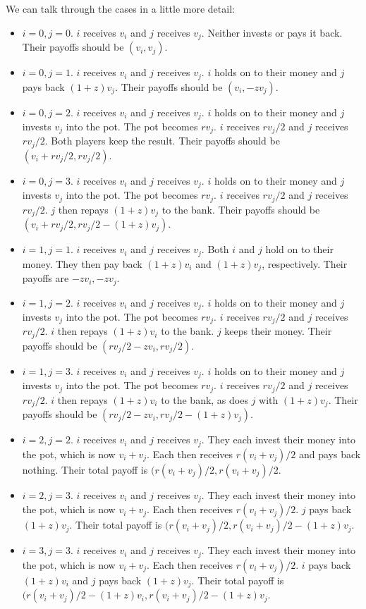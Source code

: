 \documentclass[13pt]{amsart}
\begin{document}
We can talk through the cases in a little more detail:
\begin{itemize}
    \item $i = 0, j = 0$.
    $i$ receives $v_i$ and $j$ receives $v_j$.
    Neither invests or pays it back.
    Their payoffs should be $(v_i, v_j)$.
    \item $i = 0, j = 1$.
    $i$ receives $v_i$ and $j$ receives $v_j$.
    $i$ holds on to their money and $j$ pays back $(1+z)v_j$.
    Their payoffs should be $(v_i, -zv_j)$.
    \item $i = 0, j = 2$.
    $i$ receives $v_i$ and $j$ receives $v_j$.
    $i$ holds on to their money and $j$ invests $v_j$ into the pot.
    The pot becomes $rv_j$.
    $i$ receives $rv_j/2$ and $j$ receives $rv_j/2$.
    Both players keep the result.
    Their payoffs should be $(v_i + rv_j/2, rv_j/2)$.
    \item $i = 0, j = 3$.
    $i$ receives $v_i$ and $j$ receives $v_j$.
    $i$ holds on to their money and $j$ invests $v_j$ into the pot.
    The pot becomes $rv_j$.
    $i$ receives $rv_j/2$ and $j$ receives $rv_j/2$.
    $j$ then repays $(1+z)v_j$ to the bank.
    Their payoffs should be $(v_i + rv_j/2, rv_j/2 - (1+z)v_j)$.
    \item $i = 1, j = 1$.
    $i$ receives $v_i$ and $j$ receives $v_j$.
    Both $i$ and $j$ hold on to their money.
    They then pay back $(1+z)v_i$ and $(1+z)v_j$, respectively.
    Their payoffs are $-zv_i, -zv_j$.
    \item $i = 1, j = 2$.
    $i$ receives $v_i$ and $j$ receives $v_j$.
    $i$ holds on to their money and $j$ invests $v_j$ into the pot.
    The pot becomes $rv_j$.
    $i$ receives $rv_j/2$ and $j$ receives $rv_j/2$.
    $i$ then repays $(1+z)v_i$ to the bank.
    $j$ keeps their money.
    Their payoffs should be $(rv_j/2 - zv_i, rv_j/2)$.
    \item $i = 1, j = 3$.
    $i$ receives $v_i$ and $j$ receives $v_j$.
    $i$ holds on to their money and $j$ invests $v_j$ into the pot.
    The pot becomes $rv_j$.
    $i$ receives $rv_j/2$ and $j$ receives $rv_j/2$.
    $i$ then repays $(1+z)v_i$ to the bank, as does $j$ with $(1+z)v_j$.
    Their payoffs should be $(rv_j/2 - zv_i, rv_j/2 - (1+z)v_j)$.
    \item $i = 2, j = 2$.
    $i$ receives $v_i$ and $j$ receives $v_j$.
    They each invest their money into the pot, which is now $v_i + v_j$.
    Each then receives $r(v_i + v_j)/2$ and pays back nothing.
    Their total payoff is $(r(v_i + v_j)/2, r(v_i + v_j)/2$.
    \item $i = 2, j = 3$.
    $i$ receives $v_i$ and $j$ receives $v_j$.
    They each invest their money into the pot, which is now $v_i + v_j$.
    Each then receives $r(v_i + v_j)/2$.
    $j$ pays back $(1+z)v_j$.
    Their total payoff is $(r(v_i + v_j)/2, r(v_i + v_j)/2 - (1+z)v_j$.
    \item $i = 3, j = 3$.
    $i$ receives $v_i$ and $j$ receives $v_j$.
    They each invest their money into the pot, which is now $v_i + v_j$.
    Each then receives $r(v_i + v_j)/2$.
    $i$ pays back $(1+z)v_i$ and $j$ pays back $(1+z)v_j$.
    Their total payoff is $(r(v_i + v_j)/2 - (1+z)v_i, r(v_i + v_j)/2 - (1+z)v_j$.
\end{itemize}
\end{document}
